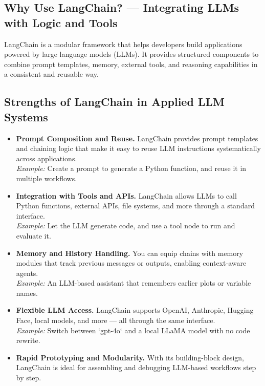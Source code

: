 %
\subsection*{Why Use LangChain? — Integrating LLMs with Logic and Tools}

LangChain is a modular framework that helps developers build applications powered by large language models (LLMs). It provides structured components to combine prompt templates, memory, external tools, and reasoning capabilities in a consistent and reusable way.

\subsection*{Strengths of LangChain in Applied LLM Systems}

\begin{itemize}
    \item \textbf{Prompt Composition and Reuse.} LangChain provides prompt templates and chaining logic that make it easy to reuse LLM instructions systematically across applications. \\
    \emph{Example:} Create a prompt to generate a Python function, and reuse it in multiple workflows.

    \item \textbf{Integration with Tools and APIs.} LangChain allows LLMs to call Python functions, external APIs, file systems, and more through a standard interface. \\
    \emph{Example:} Let the LLM generate code, and use a tool node to run and evaluate it.

    \item \textbf{Memory and History Handling.} You can equip chains with memory modules that track previous messages or outputs, enabling context-aware agents. \\
    \emph{Example:} An LLM-based assistant that remembers earlier plots or variable names.

    \item \textbf{Flexible LLM Access.} LangChain supports OpenAI, Anthropic, Hugging Face, local models, and more — all through the same interface. \\
    \emph{Example:} Switch between `gpt-4o` and a local LLaMA model with no code rewrite.

    \item \textbf{Rapid Prototyping and Modularity.} With its building-block design, LangChain is ideal for assembling and debugging LLM-based workflows step by step.

\end{itemize}

